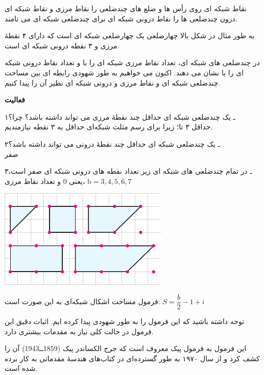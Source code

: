 \documentclass[12pt, a4paper, twoside]{book}
\begin{document}
نقاط شبکه ای روی رأس ها و ضلع های چندضلعی را نقاط مرزی و نقاط شبکه ای درون چندضلعی ها را نقاط درونی شبکه ای برای چندضلعی شبکه ای می نامند.

به طور مثال در شکل بالا چهارضلعی 
یک چهارضلعی شبکه ای است که دارای ۴ نقطهٔ مرزی و ٣ نقطه درونی شبکه ای است.
\bigskip

در چندضلعی های شبکه ای، تعداد نقاط مرزی شبکه ای را با
و تعداد نقاط درونی شبکه ای را با
نشان می دهند. اکنون می خواهیم به طور شهودی رابطه ای بین مساحت چندضلعی شبکه ای و نقاط مرزی و درونی شبکه ای نظیر آن را پیدا کنیم.
\bigskip

\textbf{فعالیت}

۱ـ یک چندضلعی شبکه ای حداقل چند نقطهٔ مرزی می تواند داشته باشد؟ چرا؟ \\
حداقل ۳ تا؛ زیرا برای رسم مثلث شبکه‌ای حداقل به ۳ نقطه نیازمندیم.




\begin{minipage}{0.68\textwidth}
	۲ـ یک چندضلعی شبکه ای حداقل چند نقطهٔ درونی می تواند داشته باشد؟ \\
	 صفر
	
	۳ـ در تمام چندضلعی های شبکه ای زیر تعداد نقطه های درونی شبکه ای صفر است، یعنی
	0
	و تعداد نقاط مرزی، 
	$\mbox{b} = 3 , 4, 5, 6 , 7$
\end{minipage}   
\begin{minipage}{.32\textwidth}
	\begin{flushleft}
		\includegraphics{"Shapes/Fasl - 3/Dars 2/P70-S1.pdf"}
	\end{flushleft}
\end{minipage}

فرمول مساحت اشکال شبکه‌ای به این صورت است:
$S = \dfrac{b}{2} -1 + i$

توجه داشته باشید که این فرمول را به طور شهودی پیدا کرده ایم. اثبات دقیق این فرمول در حالت کلی نیاز به مقدمات بیشتری دارد. 

این فرمول به فرمول پیک معروف است که جرج الکساندر پیک (1859ــ1943) آن را کشف کرد و از سال ۱۹۷۰ به طور گسترده‌ای در کتاب‌های هندسهٔ مقدماتی به کار برده شده است.
\end{document}
